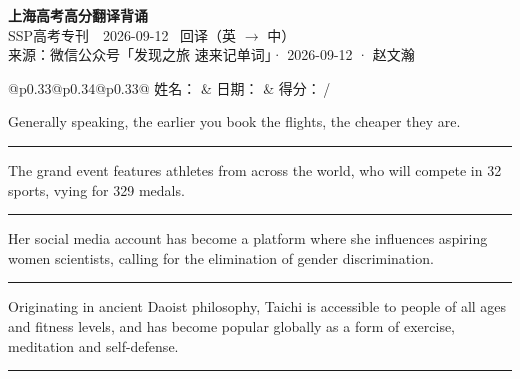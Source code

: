 \documentclass[11pt,a4paper]{article}
\newcommand{\num}[1]{\makebox[1.9em][r]{#1.}\hspace{0.3em}}
\newcommand{\wline}{\noindent\rule{\linewidth}{0.4pt}}
\begin{document}
\pagestyle{plain}
\begin{center}
{\LARGE\bfseries 上海高考高分翻译背诵 }\\[0.25em]
{\large SSP高考专刊　2026-09-12 \quad\ 回译（英 $\to$ 中）}\\[0.35em]
{\footnotesize 来源：微信公众号「发现之旅 速来记单词」· 2026-09-12 · 赵文瀚}
\end{center}

\vspace{0.4em}
\noindent\begin{tabular}{@{}p{0.33\textwidth}@{}p{0.34\textwidth}@{}p{0.33\textwidth}@{}}
姓名：\underline{\hspace{2.0cm}} & 日期：\underline{\hspace{2.0cm}} & 得分：\underline{\hspace{1.4cm}}\,/ \\
\end{tabular}

\vspace{0.5em}

\vspace{0.8em}
\num{1}Generally speaking, the earlier you book the flights, the cheaper they are.

\vspace{0.25em}

\wline

\num{2}The grand event features athletes from across the world, who will compete in 32 sports, vying for 329 medals.

\vspace{0.25em}

\wline

\num{3}Her social media account has become a platform where she influences aspiring women scientists, calling for the elimination of gender discrimination.

\vspace{0.25em}

\wline

\num{4}Originating in ancient Daoist philosophy, Taichi is accessible to people of all ages and fitness levels, and has become popular globally as a form of exercise, meditation and self-defense.

\vspace{0.25em}

\wline
\end{document}
